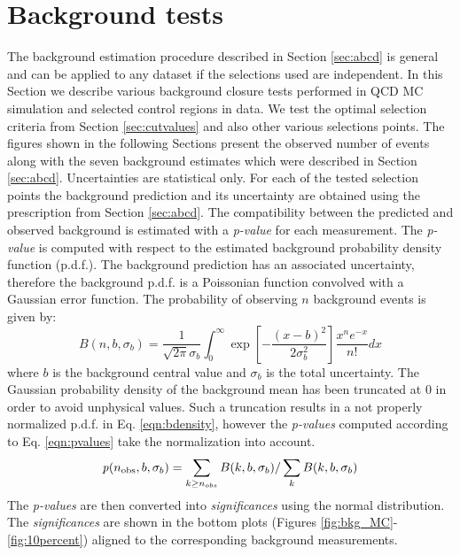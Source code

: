 \section{Background tests}
\label{sec:backgroundtests}
The background estimation procedure described in Section \ref{sec:abcd} is general and can be applied
to any dataset if the selections used are independent.
In this Section we describe various background closure tests
 performed in QCD MC simulation and 
selected control regions in data.
We test the optimal selection criteria from Section \ref{sec:cutvalues} and also other various selections points.
The figures shown in the following Sections present the observed number
of events along with the seven background estimates which were described
 in Section \ref{sec:abcd}.
Uncertainties are statistical only. 
For each of the tested selection points the background prediction 
and its uncertainty are obtained 
using the prescription from Section \ref{sec:abcd}. 
The compatibility between the predicted and observed background is estimated with a {\it p-value} for each measurement. 
 The {\it p-value}
is computed with respect to the estimated background probability density function (p.d.f.). 
The background prediction has an associated uncertainty, 
therefore the background p.d.f. is a Poissonian function convolved  
with a Gaussian error function. The probability of observing $n$ background events is given by:
\begin{equation}
B(n,b,\sigma_b)= \frac{1}{\sqrt{2\pi}\sigma_b} \int_{0}^{\infty} 
\exp\left[ -\frac{\left(x-b\right)^2}{2\sigma_b^2}\right]\frac{x^n e^{-x}}{n!}dx
\label{eqn:bdensity}
\end{equation}
where $b$ is the background central value and $\sigma_b$ is the total uncertainty.
The Gaussian probability density of the background mean has been truncated at 
0 in order to avoid unphysical values. Such a truncation results in a not properly normalized p.d.f. in Eq. 
\ref{eqn:bdensity}, however the {\it p-values} computed according to Eq. \ref{eqn:pvalues} take the 
normalization into account.   
\begin{equation}
{\it p} (n_\text{obs},b,\sigma_b) = \sum_{k\geq n_{obs}} B(k,b,\sigma_b) / \sum_{k} B(k,b,\sigma_b)
\label{eqn:pvalues}
\end{equation}
The {\it p-values} are then converted into {\it significances} using the normal
 distribution. The {\it significances} are shown in the bottom plots (Figures 
\ref{fig:bkg_MC}-\ref{fig:10percent}) aligned to the corresponding background
measurements.  

